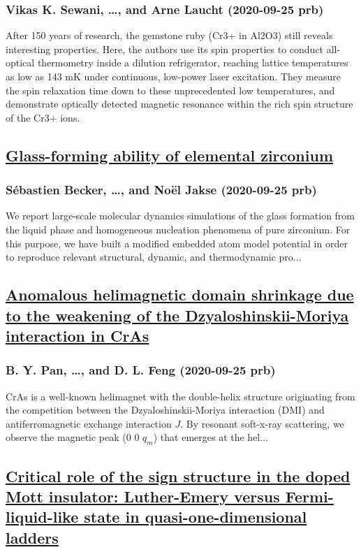 \subsubsection*{Vikas K. Sewani, \dots, and Arne Laucht (2020-09-25 prb)}
After 150 years of research, the gemstone ruby (Cr3+ in Al2O3) still reveals interesting properties. Here, the authors use its spin properties to conduct all-optical thermometry inside a dilution refrigerator, reaching lattice temperatures as low as 143 mK under continuous, low-power laser excitation. They measure the spin relaxation time down to these unprecedented low temperatures, and demonstrate optically detected magnetic resonance within the rich spin structure of the Cr3+ ions.
\subsection*{\href{http://link.aps.org/doi/10.1103/PhysRevB.102.104205}{Glass-forming ability of elemental zirconium}}
\subsubsection*{Sébastien Becker, \dots, and Noël Jakse (2020-09-25 prb)}
We report large-scale molecular dynamics simulations of the glass formation from the liquid phase and homogeneous nucleation phenomena of pure zirconium. For this purpose, we have built a modified embedded atom model potential in order to reproduce relevant structural, dynamic, and thermodynamic pro...
\subsection*{\href{http://link.aps.org/doi/10.1103/PhysRevB.102.104432}{Anomalous helimagnetic domain shrinkage due to the weakening of the Dzyaloshinskii-Moriya interaction in CrAs}}
\subsubsection*{B. Y. Pan, \dots, and D. L. Feng (2020-09-25 prb)}
CrAs is a well-known helimagnet with the double-helix structure originating from the competition between the Dzyaloshinskii-Moriya interaction (DMI) and antiferromagnetic exchange interaction $J$. By resonant soft-x-ray scattering, we observe the magnetic peak (0 0 ${q}_{m}$) that emerges at the hel...
\subsection*{\href{http://link.aps.org/doi/10.1103/PhysRevB.102.104512}{Critical role of the sign structure in the doped Mott insulator: Luther-Emery versus Fermi-liquid-like state in quasi-one-dimensional ladders}}
